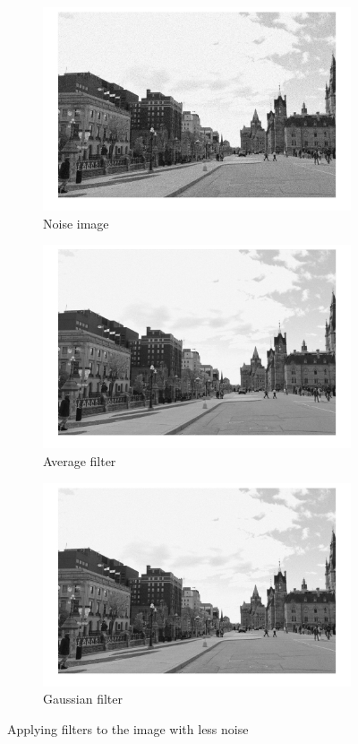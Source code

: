 \documentclass[conference]{IEEEtran}
\begin{document}
\begin{figure}[h!]
\centering
\begin{subfigure}[b]{0.3\linewidth}
\includegraphics[width=\linewidth]{images/img15.jpg}
\caption{Noise image}
\end{subfigure}
\begin{subfigure}[b]{0.3\linewidth}
\includegraphics[width=\linewidth]{images/img17.jpg}
\caption{Average filter}
\end{subfigure}
\begin{subfigure}[b]{0.3\linewidth}
\includegraphics[width=\linewidth]{images/img19.jpg}
\caption{Gaussian filter}
\end{subfigure}
\caption{Applying filters to the image with less noise}
\label{fig:less noise image}
\end{figure}
\end{document}
